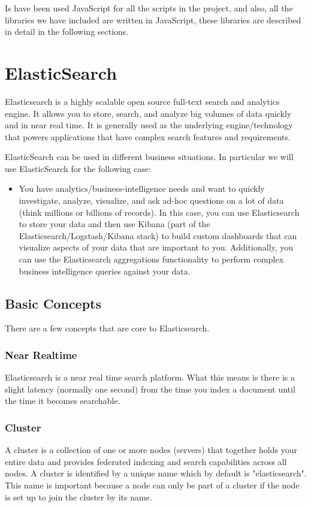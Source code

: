 \documentclass[a4paper, 12pt]{book}
\begin{document}
Is have been used JavaScript for all the scripts in the project, and also, all the libraries we have included are written in JavaScript, these libraries are described in detail in the following sections.

\section{ElasticSearch}
\label{sec:elasticsearch}
Elasticsearch is a highly scalable open source full-text search and analytics engine. It allows you to store, search, and analyze big volumes of data quickly and in near real time. It is generally used as the underlying engine/technology that powers applications that have complex search features and requirements.

ElasticSearch can be used in different business situations. In particular we will use ElasticSearch for the following case:

\begin{itemize}
\item You have analytics/business-intelligence needs and want to quickly investigate, analyze, visualize, and ask ad-hoc questions on a lot of data (think millions or billions of records). In this case, you can use Elasticsearch to store your data and then use Kibana (part of the Elasticsearch/Logstash/Kibana stack) to build custom dashboards that can visualize aspects of your data that are important to you. Additionally, you can use the Elasticsearch aggregations functionality to perform complex business intelligence queries against your data.
\end{itemize}

\subsection{Basic Concepts}
There are a few concepts that are core to Elasticsearch.

\subsubsection{Near Realtime}
Elasticsearch is a near real time search platform. What this means is there is a slight latency (normally one second) from the time you index a document until the time it becomes searchable.

\subsubsection{Cluster}
A cluster is a collection of one or more nodes (servers) that together holds your entire data and provides federated indexing and search capabilities across all nodes. A cluster is identified by a unique name which by default is "elasticsearch". This name is important because a node can only be part of a cluster if the node is set up to join the cluster by its name.
\end{document}
